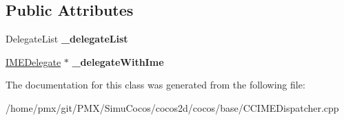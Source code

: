\subsection*{Public Attributes}
\begin{DoxyCompactItemize}
\item 
\mbox{\label{classIMEDispatcher_1_1Impl_adbdddcd92be54a2f960ece29f178230f}} 
Delegate\+List {\bfseries \+\_\+delegate\+List}
\item 
\mbox{\label{classIMEDispatcher_1_1Impl_a64dfc5479f31f11fbefc0d91c6282f78}} 
\hyperlink{classIMEDelegate}{I\+M\+E\+Delegate} $\ast$ {\bfseries \+\_\+delegate\+With\+Ime}
\end{DoxyCompactItemize}


The documentation for this class was generated from the following file\+:\begin{DoxyCompactItemize}
\item 
/home/pmx/git/\+P\+M\+X/\+Simu\+Cocos/cocos2d/cocos/base/C\+C\+I\+M\+E\+Dispatcher.\+cpp\end{DoxyCompactItemize}
